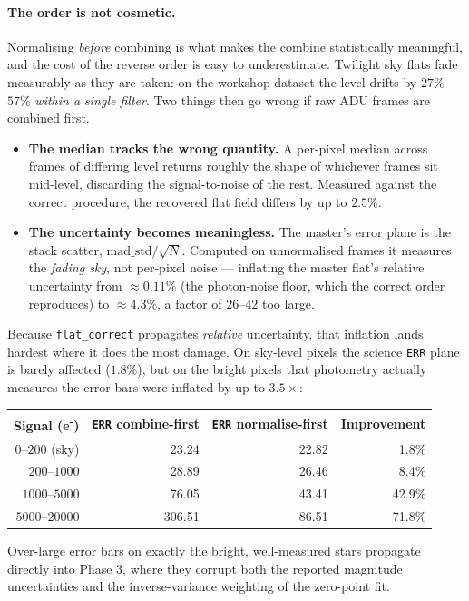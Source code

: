 \documentclass[11pt,a4paper]{article}
\begin{document}
\paragraph{The order is not cosmetic.} Normalising \emph{before} combining is what makes the combine statistically meaningful, and the cost of the reverse order is easy to underestimate. Twilight sky flats fade measurably as they are taken: on the workshop dataset the level drifts by $27\%$--$57\%$ \emph{within a single filter}. Two things then go wrong if raw ADU frames are combined first.
\begin{itemize}[leftmargin=*]
    \item \textbf{The median tracks the wrong quantity.} A per-pixel median across frames of differing level returns roughly the shape of whichever frames sit mid-level, discarding the signal-to-noise of the rest. Measured against the correct procedure, the recovered flat field differs by up to $2.5\%$.
    \item \textbf{The uncertainty becomes meaningless.} The master's error plane is the stack scatter, $\mathrm{mad\_std}/\sqrt{N}$. Computed on unnormalised frames it measures the \emph{fading sky}, not per-pixel noise --- inflating the master flat's relative uncertainty from $\approx 0.11\%$ (the photon-noise floor, which the correct order reproduces) to $\approx 4.3\%$, a factor of $26$--$42$ too large.
\end{itemize}
Because \texttt{flat\_correct} propagates \emph{relative} uncertainty, that inflation lands hardest where it does the most damage. On sky-level pixels the science \texttt{ERR} plane is barely affected ($1.8\%$), but on the bright pixels that photometry actually measures the error bars were inflated by up to $3.5\times$:
\begin{center}
\begin{tabular}{@{}rrrr@{}}
    \toprule
    Signal (e\textsuperscript{-}) & \texttt{ERR} combine-first & \texttt{ERR} normalise-first & Improvement \\
    \midrule
    $0$--$200$ (sky)   &  23.24 & 22.82 &  1.8\% \\
    $200$--$1000$      &  28.89 & 26.46 &  8.4\% \\
    $1000$--$5000$     &  76.05 & 43.41 & 42.9\% \\
    $5000$--$20000$    & 306.51 & 86.51 & 71.8\% \\
    \bottomrule
\end{tabular}
\end{center}
Over-large error bars on exactly the bright, well-measured stars propagate directly into Phase 3, where they corrupt both the reported magnitude uncertainties and the inverse-variance weighting of the zero-point fit.
\end{document}
